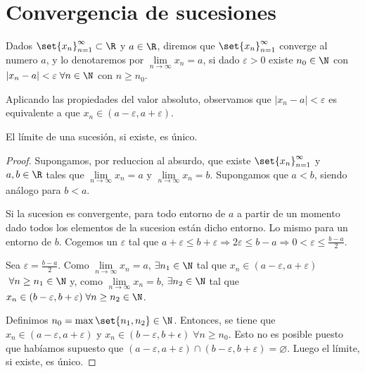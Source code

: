 \section{Convergencia de sucesiones}
\begin{definition}[Convergencia]
	Dados \(\set{x_n}^{\infty}_{n=1 } \subset \R 	 \) y \(a \in \R \), diremos que \(\set{x_n}^{\infty}_{n = 1 } \) converge al numero \(a \), y lo denotaremos por \(\lim\limits_{n \to \infty} x_n = a \), si dado \(\varepsilon > 0 \) existe \(n_0 \in \N \) con \(|x_n - a| < \varepsilon \; \forall n \in \N \) con \(n \geq n_0 \).
	
\end{definition}
\begin{remark}
	Aplicando las propiedades del valor absoluto, observamos que \(|x_n - a | < \varepsilon\) es equivalente a que \(x_n \in (a - \varepsilon, a + \varepsilon)\).
\end{remark}
\begin{proposition}
	El límite de una sucesión, si existe, es único.
\end{proposition}
\begin{proof}
	Supongamos, por reduccion al absurdo, que existe \(\set{x_n}^{\infty}_{n = 1} \) y \(a,b \in \R \) tales que \(\lim\limits_{n \to \infty} x_n = a \) y \(\lim\limits_{n \to \infty} x_n = b \). Supongamos que \(a < b \), siendo análogo para \(b < a \).
	
	Si la sucesion es convergente, para todo entorno de \(a\) a partir de un momento dado todos los elementos de la sucesion están dicho entorno. Lo mismo para un entorno de \(b \). Cogemos un \(\varepsilon\) tal que \(a + \varepsilon \leq b + \varepsilon \Rightarrow 2\varepsilon \leq b - a \Rightarrow 0 < \varepsilon \leq \frac{b-a}{ 2}\).
	
	Sea \(\varepsilon = \frac{b-a }{2 }\). Como \(\lim\limits_{n  \to \infty} x_n = a \),  \(\exists n_1 \in \N \) tal que \(x_n \in (a - \varepsilon, a + \varepsilon)\) \( \; \forall n \geq  n_{1} \in \N \) y, como \(\lim\limits_{n \to \infty} x_n = b \),  \( \exists n_2 \in  \N \) tal que \(x_n \in (b - \varepsilon, b + \varepsilon) \; \forall n \geq  n_2 \in \N\). 
	
	Definimos \(n_0 = \max\set{n_1,n_2} \in \N \). Entonces, se tiene que \(x_n \in (a - \varepsilon, a + \varepsilon)\) y \(x_n \in (b - \varepsilon, b + \epsilon) \; \forall n \geq n_0\). Esto no es posible puesto que habíamos supuesto que \((a - \varepsilon, a + \varepsilon) \cap (b - \varepsilon, b + \varepsilon) = \varnothing \). Luego el límite, si existe, es único.
\end{proof}

